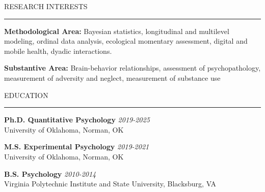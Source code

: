 \documentclass{resume} %
\renewenvironment{rSection}[1]{
\sectionskip
\textcolor{CarnegieMellonRed}{\MakeUppercase{#1}}
\sectionlineskip
\hrule
\begin{list}{}{
\setlength{\leftmargin}{1.5em}
}
\item[]
}{
\end{list}
}
\begin{document}
\begin{rSection}{Research Interests}
\textbf{Methodological Area:} Bayesian statistics, longitudinal and multilevel modeling, ordinal data analysis, ecological
momentary assessment, digital and mobile health, dyadic interactions.

\textbf{Substantive Area:} Brain-behavior relationships, assessment of psychopathology, measurement of adversity and neglect, measurement of substance use
\end{rSection}


\begin{rSection}{Education}
{\bf Ph.D. Quantitative Psychology} \hfill {\em 2019-2025} 
\\ University of Oklahoma, Norman, OK \hfill 

{\bf M.S. Experimental Psychology} \hfill {\em 2019-2021} 
\\ University of Oklahoma, Norman, OK \hfill

{\bf B.S. Psychology} \hfill {\em 2010-2014}
\\ Virginia Polytechnic Institute and State University, Blacksburg, VA

\end{rSection}
\end{document}
